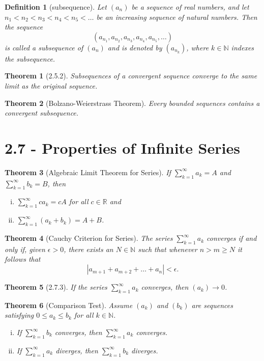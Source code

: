 \documentclass{article}
\newtheorem{definition}{Definition}
\newtheorem{theorem}{Theorem}
\begin{document}
\begin{definition}[subsequence]
    Let $(a_n)$ be a sequence of real numbers, and let $n_1 < n_2 < n_3 < n_4 < n_5 < \dots$ be an increasing sequence of natural numbers. Then the sequence \[(a_{n_1},a_{n_2},a_{n_3},a_{n_4},a_{n_5},\dots )\] is called a \textit{subsequence} of $(a_n)$ and is denoted by $(a_{n_k})$, where $k \in \mathbb{N}$ indexes the subsequence.
\end{definition}

\begin{theorem}[2.5.2]
    Subsequences of a convergent sequence converge to the same limit as the original sequence.
\end{theorem}

\begin{theorem}[Bolzano-Weierstrass Theorem]
    Every bounded sequences contains a convergent subsequence.
\end{theorem}


\section*{2.7 - Properties of Infinite Series}
\begin{theorem}[Algebraic Limit Theorem for Series]
    If $\sum _{k = 1}^\infty a_k = A$ and $\sum _{k =1}^\infty b_k = B$, then
    \begin{enumerate}[(i)]
        \item $\sum _{k=1}^\infty ca_k = cA$ for all $c \in \mathbb{R}$ and 
        \item $\sum _{k = 1}^\infty (a_k+b_k) = A+B$.
    \end{enumerate}
\end{theorem}

\begin{theorem}[Cauchy Criterion for Series]
    The series $\sum _{k = 1}^\infty a_k$ converges if and only if, given $\epsilon > 0$, there exists an $N \in \mathbb{N}$ such that whenever $n > m \geq N$ it follows that \[|
    a_{m+1}+a_{m+2}+\dots + a_n| < \epsilon .\]
\end{theorem}

\begin{theorem}[2.7.3]
    If the series $\sum _{k=1}^\infty a_k$ converges, then $(a_k)\rightarrow 0$.
\end{theorem}

\begin{theorem}[Comparison Test]
    Assume $(a_k)$ and $(b_k)$ are sequences satisfying $0 \leq a_k \leq b_k$ for all $k \in \mathbb{N}$.
    \begin{enumerate}[(i)]
        \item If $\sum _{k=1}^\infty b_k$ converges, then $\sum _{k=1}^\infty a_k$ converges.
        \item If $\sum _{k=1}^\infty a_k$ diverges, then $\sum _{k=1}^\infty b_k$ diverges.
    \end{enumerate}
\end{theorem}
\end{document}
